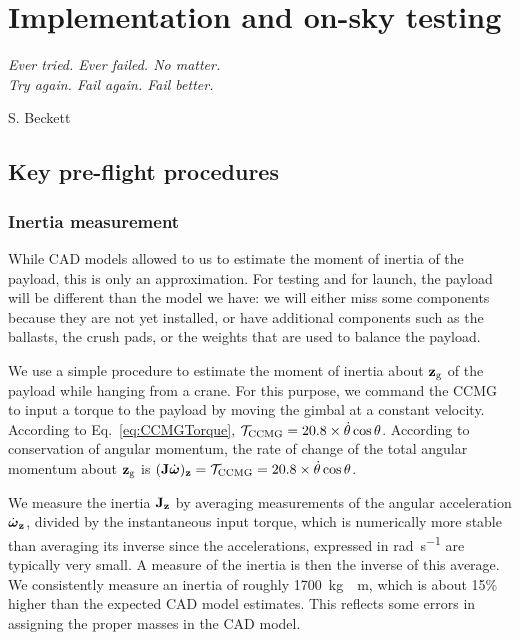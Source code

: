 
\chapter[Implementation and on-sky testing]{Implementation and on-sky testing} %
\label{chap:implementation}

\epigraph{\small\itshape Ever tried. Ever failed. No matter. \\ Try again. Fail again. Fail better.}{S. Beckett}

\section{Key pre-flight procedures}
\subsection{Inertia measurement}
While CAD models allowed to us to estimate the moment of inertia of the payload, this is only an approximation. For testing and for launch, the payload will be different than the model we have: we will either miss some components because they are not yet installed, or have additional components such as the ballasts, the crush pads, or the weights that are used to balance the payload.

We use a simple procedure to estimate the moment of inertia about $\textrm{\textbf{z}}_{\textrm{g}}$ of the payload while hanging from a crane. For this purpose, we command the CCMG to input a torque to the payload by moving the gimbal at a constant velocity. According to Eq.~\ref{eq:CCMGTorque}, $\mathcal{T}_{\textrm{CCMG}} =  20.8\times \dot{\theta}\cos\theta$. According to conservation of angular momentum, the rate of change of the total angular momentum about $\textrm{\textbf{z}}_{\textrm{g}}$ is $(\textrm{\textbf{J}}\dot{\boldsymbol\omega})_{\textrm{\textbf{z}}} = \mathcal{T}_{\textrm{CCMG}} = 20.8\times \dot{\theta}\cos\theta$.

We measure the inertia $\textrm{\textbf{J}}_{\textrm{\textbf{z}}}$ by averaging measurements of the angular acceleration $\dot{\boldsymbol\omega}_{\textrm{\textbf{z}}}$, divided by the instantaneous input torque, which is numerically more stable than averaging its inverse since the accelerations, expressed in \si{\radian\per\second} are typically very small. A measure of the inertia is then the inverse of this average. We consistently measure an inertia of roughly \SI{1700}{\kilo\gram{}\meter}, which is about 15\% higher than the expected CAD model estimates. This reflects some errors in assigning the proper masses in the CAD model.


